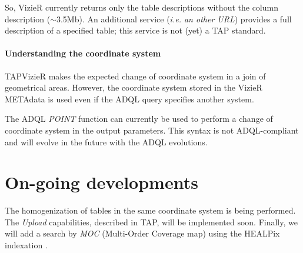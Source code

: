 So, VizieR currently returns only the table descriptions without the 
column description ($\sim$3.5Mb). 
An additional service (\textit{i.e. an other URL}) provides a full
description of a specified table; this service is not (yet) a TAP standard.

\paragraph{Understanding the coordinate system}

TAPVizieR makes the expected change of coordinate system in a join of 
geometrical  areas. However, the coordinate system stored in the VizieR 
METAdata is used even if the ADQL query specifies another system.

The ADQL {\em POINT} function can currently be used %
to perform a change of coordinate system in the output parameters.
This syntax is not ADQL-compliant and  will evolve in the future with
the ADQL evolutions.

\section{On-going developments}

The homogenization of tables in the same coordinate system is being performed. %
The {\em Upload} capabilities, described in TAP, will be implemented soon.
Finally, we will add a search by {\em MOC}  (Multi-Order Coverage map) 
using the HEALPix indexation \citep{O13_adassxxii}.


